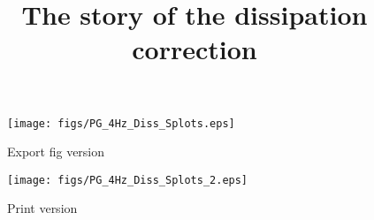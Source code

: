 \documentclass{article}
\title{The story of the dissipation correction}
\date{}
\begin{document}
\maketitle

\begin{figure}
    \centering
    \texttt{[image: figs/PG\_4Hz\_Diss\_Splots.eps]}
    \caption{Export fig version}
    \label{dissPlots1}
\end{figure}

\begin{figure}
    \centering
    \texttt{[image: figs/PG\_4Hz\_Diss\_Splots\_2.eps]}
    \caption{Print version}
    \label{dissPlots2}
\end{figure}
\end{document}
